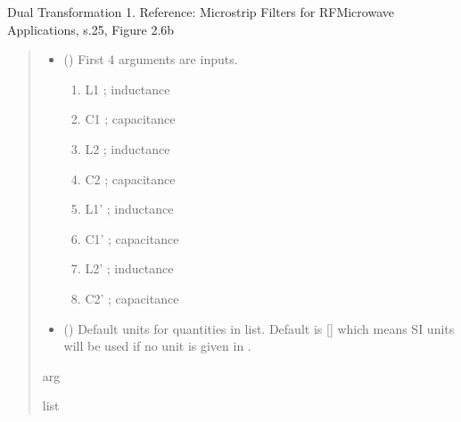 \documentclass[letterpaper,10pt,english]{sphinxmanual}
\begin{document}

\begin{fulllineitems}
\label{\detokenize{components:components.DualTransformation2}}
\pysigstartsignatures
{}
\pysigstopsignatures
\sphinxAtStartPar
Dual Transformation 1.
Reference:  Microstrip Filters for RF\sphinxhyphen{}Microwave Applications, s.25, Figure 2.6b
\begin{quote}\begin{description}
\begin{itemize}
\item {}
\sphinxAtStartPar
{} () \textendash{}
\sphinxAtStartPar
First 4 arguments are inputs.
\begin{enumerate}
%
\item {}
\sphinxAtStartPar
L1 ; inductance

\item {}
\sphinxAtStartPar
C1 ; capacitance

\item {}
\sphinxAtStartPar
L2 ; inductance

\item {}
\sphinxAtStartPar
C2 ; capacitance

\item {}
\sphinxAtStartPar
L1’ ; inductance

\item {}
\sphinxAtStartPar
C1’ ; capacitance

\item {}
\sphinxAtStartPar
L2’ ; inductance

\item {}
\sphinxAtStartPar
C2’ ; capacitance

\end{enumerate}


\item {}
\sphinxAtStartPar
{} (\sphinxstyleliteralemphasis{\sphinxupquote{, }}) \textendash{} Default units for quantities in  list. Default is {[}{]} which means SI units will be used if no unit is given in .

\end{itemize}

\sphinxAtStartPar
arg

\sphinxAtStartPar
list

\end{description}\end{quote}

\end{fulllineitems}
\end{document}
